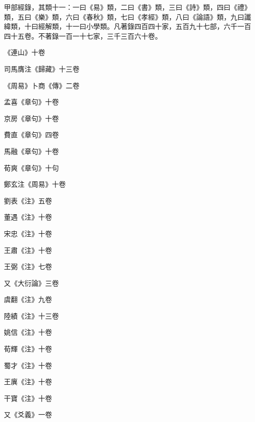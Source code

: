 \begin{pinyinscope}
 甲部經錄，其類十一：一曰《易》類，二曰《書》類，三曰《詩》類，四曰《禮》類，五曰《樂》類，六曰《春秋》類，七曰《孝經》類，八曰《論語》類，九曰讖緯類，十曰經解類，十一曰小學類。凡著錄四百四十家，五百九十七部，六千一百四十五卷。不著錄一百一十七家，三千三百六十卷。



 《連山》十卷



 司馬膺注《歸藏》十三卷



 《周易》卜商《傳》二卷



 孟喜《章句》十卷



 京房《章句》十卷



 費直《章句》四卷



 馬融《章句》十卷



 荀爽《章句》十句



 鄭玄注《周易》十卷



 劉表《注》五卷



 董遇《注》十卷



 宋忠《注》十卷



 王肅《注》十卷



 王弼《注》七卷



 又《大衍論》三卷



 虞翻《注》九卷



 陸績《注》十三卷



 姚信《注》十卷



 荀輝《注》十卷



 蜀才《注》十卷



 王廙《注》十卷



 干寶《注》十卷



 又《爻義》一卷




\end{pinyinscope}
